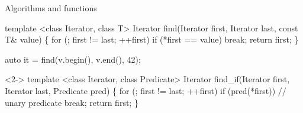 \begin{frame}[fragile]{Algorithms and functions}

  \begin{codeblock}{\tiny
template <class Iterator, class T>
Iterator find(Iterator first, Iterator last, \alert{const T\& value})
\{
  for (; first != last; ++first)
    if (\alert{*first == value})
      break;
  return first;
\}

auto it = find(v.begin(), v.end(), 42);}\end{codeblock}

  \begin{codeblock}<2->
template <class Iterator, class Predicate>
Iterator find_if(Iterator first, Iterator last, \alert{Predicate pred})
\{
  for (; first != last; ++first)
    if (\alert{pred(*first)})         // unary predicate
      break;
  return first;
\}


\end{codeblock}

\end{frame}

